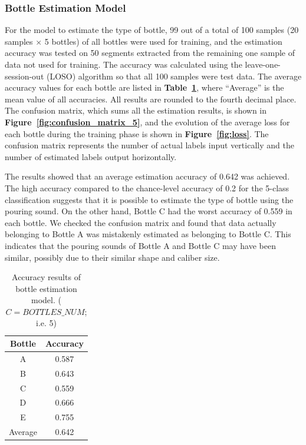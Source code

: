 \documentclass[manuscript,screen,anonymous,review]{acmart}
\newcommand\figref[1]{\textbf{Figure~\ref{fig:#1}}}
\newcommand\tabref[1]{\textbf{Table~\ref{tab:#1}}}
\begin{document}
\subsubsection{Bottle Estimation Model}
For the model to estimate the type of bottle, 99 out of a total of 100 samples (20 samples $\times$ 5 bottles) of all bottles were used for training, and the estimation accuracy was tested on 50 segments extracted from the remaining one sample of data not used for training. The accuracy was calculated using the leave-one-session-out (LOSO) algorithm so that all 100 samples were test data. The average accuracy values for each bottle are listed in \tabref{result_5}, where ``Average'' is the mean value of all accuracies. All results are rounded to the fourth decimal place. The confusion matrix, which sums all the estimation results, is shown in \figref{confusion_matrix_5}, and the evolution of the average loss for each bottle during the training phase is shown in \figref{loss}. The confusion matrix represents the number of actual labels input vertically and the number of estimated labels output horizontally.\par

The results showed that an average estimation accuracy of 0.642 was achieved. The high accuracy compared to the chance-level accuracy of 0.2 for the 5-class classification suggests that it is possible to estimate the type of bottle using the pouring sound. On the other hand, Bottle C had the worst accuracy of 0.559 in each bottle. We checked the confusion matrix and found that data actually belonging to Bottle A was mistakenly estimated as belonging to Bottle C. This indicates that the pouring sounds of Bottle A and Bottle C may have been similar, possibly due to their similar shape and caliber size.

\begin{table}[!t]
  \centering
  \caption{Accuracy results of bottle estimation model. ($C=BOTTLES\_NUM$; i.e. 5)}
  \begin{tabular}{c|c} \hline\hline
    Bottle & Accuracy \\ \hline
    A & 0.587 \\
    B & 0.643 \\
    C & 0.559 \\
    D & 0.666 \\
    E & 0.755 \\ \hline
    Average & 0.642 \\ \hline
  \end{tabular}
  \label{tab:result_5}
\end{table}
\end{document}
